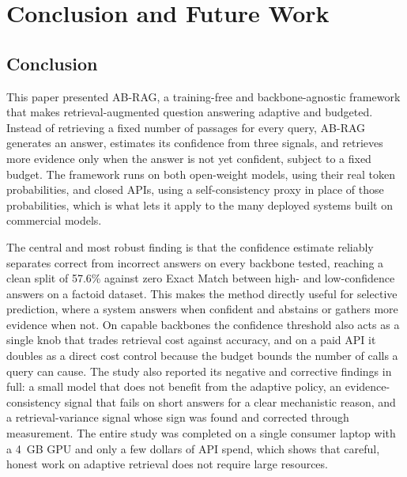 \documentclass[conference,a4paper,10pt]{IEEEtran}
\begin{document}
\section{Conclusion and Future Work}
\label{sec:conclusion}

\subsection{Conclusion}
This paper presented AB-RAG, a training-free and backbone-agnostic framework that makes
retrieval-augmented question answering adaptive and budgeted. Instead of retrieving a
fixed number of passages for every query, AB-RAG generates an answer, estimates its
confidence from three signals, and retrieves more evidence only when the answer is not yet
confident, subject to a fixed budget. The framework runs on both open-weight models, using
their real token probabilities, and closed APIs, using a self-consistency proxy in place
of those probabilities, which is what lets it apply to the many deployed systems built on
commercial models.

The central and most robust finding is that the confidence estimate reliably separates
correct from incorrect answers on every backbone tested, reaching a clean split of 57.6\%
against zero Exact Match between high- and low-confidence answers on a factoid dataset.
This makes the method directly useful for selective prediction, where a system answers
when confident and abstains or gathers more evidence when not. On capable backbones the
confidence threshold also acts as a single knob that trades retrieval cost against
accuracy, and on a paid API it doubles as a direct cost control because the budget bounds
the number of calls a query can cause. The study also reported its negative and corrective
findings in full: a small model that does not benefit from the adaptive policy, an
evidence-consistency signal that fails on short answers for a clear mechanistic reason,
and a retrieval-variance signal whose sign was found and corrected through measurement. The
entire study was completed on a single consumer laptop with a 4~GB GPU and only a few
dollars of API spend, which shows that careful, honest work on adaptive retrieval does not
require large resources.
\end{document}
